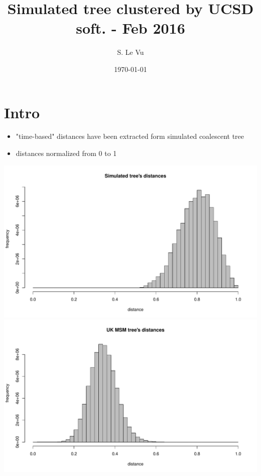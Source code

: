 \documentclass[]{revtex4}\usepackage[]{graphicx}\usepackage[]{color}
\begin{document}
\title{Simulated tree clustered by UCSD soft. - Feb 2016}
\author{S. Le Vu}
\date{\today}

\maketitle





\section{Intro}
\begin{itemize}
\item "time-based" distances have been extracted form simulated coalescent tree
\item distances normalized from 0 to 1
\end{itemize}
\begin{center}
\includegraphics[scale=0.4]{figure/plotget_distances-1.pdf}
\includegraphics[scale=0.4]{figure/plotget_distances-2.pdf}
\end{center}
\end{document}
